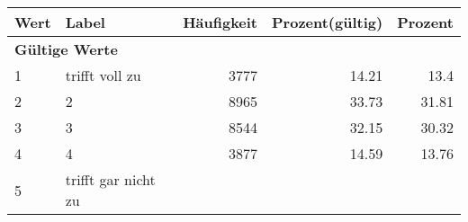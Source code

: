      \begin{longtable}{lXrrr}
     \toprule
     \textbf{Wert} & \textbf{Label} & \textbf{Häufigkeit} & \textbf{Prozent(gültig)} & \textbf{Prozent} \\
     \endhead
     \midrule
     \multicolumn{5}{l}{\textbf{Gültige Werte}}\\

     1 &
     \multicolumn{1}{X}{ trifft voll zu   } &


       \num{3777} &
       \num[round-mode=places,round-precision=2]{14,21} &
         \num[round-mode=places,round-precision=2]{13,4} \\

     2 &
     \multicolumn{1}{X}{ 2   } &


       \num{8965} &
       \num[round-mode=places,round-precision=2]{33,73} &
         \num[round-mode=places,round-precision=2]{31,81} \\

     3 &
     \multicolumn{1}{X}{ 3   } &


       \num{8544} &
       \num[round-mode=places,round-precision=2]{32,15} &
         \num[round-mode=places,round-precision=2]{30,32} \\

     4 &
     \multicolumn{1}{X}{ 4   } &


       \num{3877} &
       \num[round-mode=places,round-precision=2]{14,59} &
         \num[round-mode=places,round-precision=2]{13,76} \\

     5 &
     \multicolumn{1}{X}{ trifft gar nicht zu   } &



\end{longtable}
